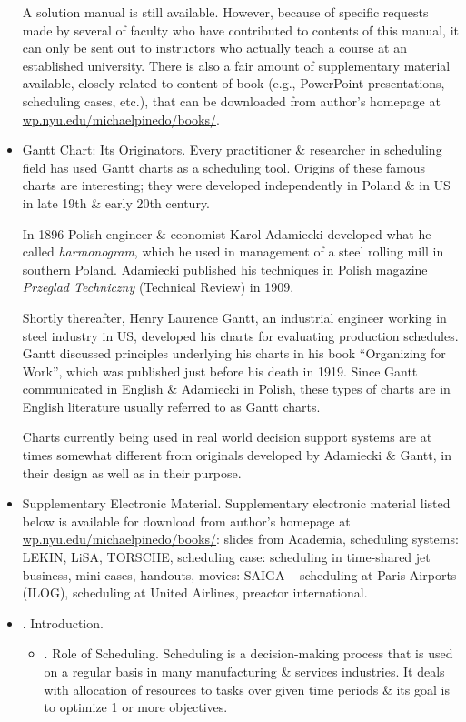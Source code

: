 \documentclass{article}
\begin{document}
\begin{itemize}
    A solution manual is still available. However, because of specific requests made by several of faculty who have contributed to contents of this manual, it can only be sent out to instructors who actually teach a course at an established university. There is also a fair amount of supplementary material available, closely related to content of book (e.g., PowerPoint presentations, scheduling cases, etc.), that can be downloaded from author's homepage at \url{wp.nyu.edu/michaelpinedo/books/}.
    \item {\sf Gantt Chart: Its Originators.} Every practitioner \& researcher in scheduling field has used Gantt charts as a scheduling tool. Origins of these famous charts are interesting; they were developed independently in Poland \& in US in late 19th \& early 20th century.

    In 1896 Polish engineer \& economist {\sc Karol Adamiecki} developed what he called {\it harmonogram}, which he used in management of a steel rolling mill in southern Poland. {\sc Adamiecki} published his techniques in Polish magazine {\it Przeglad Techniczny} (Technical Review) in 1909.

    Shortly thereafter, {\sc Henry Laurence Gantt}, an industrial engineer working in steel industry in US, developed his charts for evaluating production schedules. {\sc Gantt} discussed principles underlying his charts in his book ``Organizing for Work'', which was published just before his death in 1919. Since {\sc Gantt} communicated in English \& {\sc Adamiecki} in Polish, these types of charts are in English literature usually referred to as Gantt charts.

    Charts currently being used in real world decision support systems are at times somewhat different from originals developed by {\sc Adamiecki \& Gantt}, in their design as well as in their purpose.
    \item {\sf Supplementary Electronic Material.} Supplementary electronic material listed below is available for download from author's homepage at \url{wp.nyu.edu/michaelpinedo/books/}: slides from Academia, scheduling systems: LEKIN, LiSA, TORSCHE, scheduling case: scheduling in time-shared jet business, mini-cases, handouts, movies: SAIGA -- scheduling at Paris Airports (ILOG), scheduling at United Airlines, preactor international.
    \item {. Introduction.}
    \begin{itemize}
        \item {. Role of Scheduling.} Scheduling is a decision-making process that is used on a regular basis in many manufacturing \& services industries. It deals with allocation of resources to tasks over given time periods \& its goal is to optimize 1 or more objectives.


\end{itemize}
\end{itemize}
\end{document}
